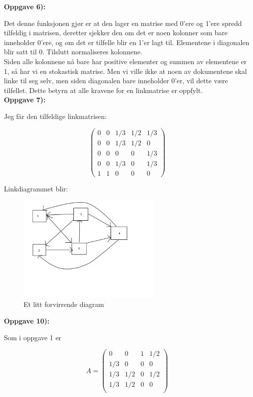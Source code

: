 \documentclass[a4paper,norsk,11pt,twoside]{article}
\begin{document}
\textbf{Oppgave 6):}

Det denne funksjonen gjør er at den lager en matrise med 0'ere og 1'ere spredd tilfeldig i matrisen, deretter sjekker den om det er noen kolonner som bare inneholder 0'ere, og om det er tilfelle blir en 1'er lagt til. Elementene i diagonalen blir satt til 0. Tilslutt normaliseres kolonnene. \\

Siden alle kolonnene nå bare har positive elementer og summen av elementene er 1, så har vi en stokastisk matrise. Men vi ville ikke at noen av dokumentene skal linke til seg selv, men siden diagonalen bare inneholder 0'er, vil dette være tilfellet. Dette betyrn at alle kravene for en linkmatrise er oppfylt.\\

\textbf{Oppgave 7):}

Jeg får den tilfeldige linkmatrisen:

$$
\begin{pmatrix}
0 & 0 & 1/3 & 1/2 & 1/3 \\
0 & 0 & 1/3 & 1/2 & 0 \\
0 & 0 & 0 & 0 & 1/3 \\
0 & 0 & 1/3 & 0 & 1/3 \\
1 & 1 & 0 & 0 & 0
\end{pmatrix}
$$ 

Linkdiagrammet blir:

\begin{figure}[hbt]
\begin{center}
\includegraphics[width=70mm]{linkdiagram.png}
\caption{Et litt forvirrende diagram}\label{fig:finfigur}
\end{center}
\end{figure} 


\textbf{Oppgave 10):}

Som i oppgave 1 er

$$
A = 
\begin{pmatrix}
0 & 0 & 1 & 1/2\\
1/3 & 0 & 0 & 0\\
1/3 & 1/2 & 0 & 1/2\\
1/3 & 1/2 & 0 & 0\\
\end{pmatrix}
$$
\end{document}
